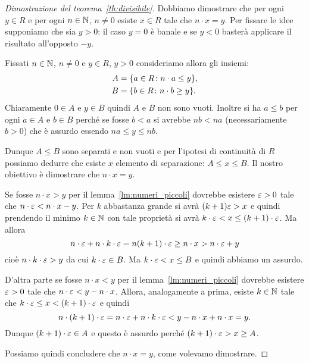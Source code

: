%
\begin{proof}[Dimostrazione del teorema~\ref{th:divisibile}]
  Dobbiamo dimostrare che per ogni $y\in R$ e per ogni $n\in {\mathbb N}$, $n\neq 0$
  esiste $x\in R$ tale che $n\cdot x=y$.
  Per fissare le idee supponiamo che sia $y>0$: il caso $y=0$ è banale 
  e se $y<0$ basterà applicare il risultato all'opposto $-y$.
  
  Fissati $n\in {\mathbb N}$, $n\neq 0$ e $y\in R$, $y>0$ 
  consideriamo allora gli insiemi:
  \begin{align*}
    A &= {\left\{ a\in R\colon n\cdot a\le y \right\}},\\
    B &= {\left\{ b\in R\colon n\cdot b\ge y \right\}}.
  \end{align*}
  Chiaramente $0\in A$ e $y\in B$ quindi $A$ e $B$ non sono vuoti.
  Inoltre si ha $a\le b$ per ogni $a\in A$ e $b\in B$ 
  perché se fosse $b < a$ si avrebbe $nb < na$ 
  (necessariamente $b>0$) che 
  è assurdo essendo $na \le y \le nb$.
  
  Dunque $A\le B$ sono separati e non vuoti e per l'ipotesi di continuità di $R$ 
  possiamo dedurre che esiste $x$ elemento di separazione: $A\le x \le B$.
  Il nostro obiettivo è dimostrare che $n\cdot x=y$.

  Se fosse $n\cdot x > y$ per il lemma~\ref{lm:numeri_piccoli} dovrebbe 
  esistere $\varepsilon>0$ tale che $n\cdot \varepsilon < n\cdot x - y$.
  Per $k$ abbastanza grande si avrà $(k+1)\varepsilon > x$ e quindi prendendo 
  il minimo $k\in {\mathbb N}$ con tale proprietà si avrà
  $k\cdot \varepsilon < x \le (k+1)\cdot \varepsilon$.
  Ma allora 
  \[
    n\cdot \varepsilon + n\cdot k\cdot \varepsilon
    = n(k+1)\cdot \varepsilon 
    \ge n\cdot x 
    > n\cdot \varepsilon + y 
  \]
  cioè $n\cdot k\cdot \varepsilon > y$ da cui
  $k\cdot \varepsilon \in B$. 
  Ma $k\cdot\varepsilon < x \le B$ e quindi abbiamo un assurdo.

  D'altra parte se fosse $n\cdot x < y$ per il lemma~\ref{lm:numeri_piccoli}
  dovrebbe esistere $\varepsilon>0$ tale che $n\cdot \varepsilon < y-n\cdot x$.
  Allora, analogamente a prima, esiste $k\in{\mathbb N}$ tale che 
  $k\cdot \varepsilon \le x < (k+1)\cdot \varepsilon$ e quindi
  \[
    n\cdot (k+1) \cdot \varepsilon 
    = n\cdot \varepsilon + n \cdot k \cdot \varepsilon 
    < y - n\cdot x + n\cdot x 
    =y.  
  \]
  Dunque $(k+1)\cdot \varepsilon \in A$ e questo è assurdo perché 
  $(k+1)\cdot \varepsilon > x \ge A$.

  Possiamo quindi concludere che $n\cdot x = y$, come volevamo dimostrare.
\end{proof}
%

